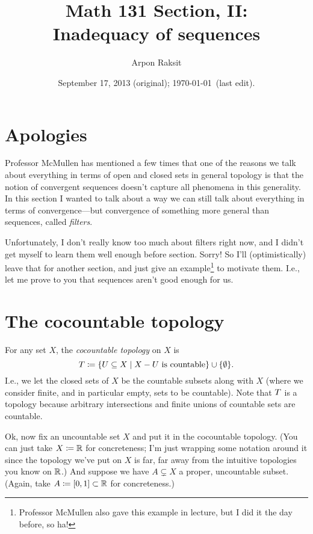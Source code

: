 


\title{Math 131 Section, II:\\Inadequacy of sequences}
\author{Arpon Raksit}
\date{September 17, 2013 (original); \today\ (last edit).}


\maketitle
\thispagestyle{fancy}


\section{Apologies}

Professor McMullen has mentioned a few times that one of the reasons
we talk about everything in terms of open and closed sets in general
topology is that the notion of convergent sequences doesn't capture
all phenomena in this generality. In this section I wanted to talk
about a way we can still talk about everything in terms of
convergence---but convergence of something more general than
sequences, called \textit{filters}.

Unfortunately, I don't really know too much about filters right now,
and I didn't get myself to learn them well enough before
section. Sorry! So I'll (optimistically) leave that for another
section, and just give an example\footnote{Professor McMullen also
  gave this example in lecture, but I did it the day before, so ha!}
to motivate them. I.e., let me prove to you that sequences aren't good
enough for us.

\section{The cocountable topology}

\begin{definition}
  For any set $X$, the \textit{cocountable topology} on $X$ is
\[
T \coloneqq \{U \subseteq X \mid X - U \text{ is countable}\} \cup
\{\emptyset\}.
\]
I.e., we let the closed sets of $X$ be the countable subsets along
with $X$ (where we consider finite, and in particular empty, sets to
be countable). Note that $T$ is a topology because arbitrary
intersections and finite unions of countable sets are countable.
\end{definition}

Ok, now fix an uncountable set $X$ and put it in the cocountable
topology. (You can just take $X \coloneqq \mathbb{R}$ for concreteness; I'm just
wrapping some notation around it since the topology we've put on $X$
is far, far away from the intuitive topologies you know on $\mathbb{R}$.)  And
suppose we have $A \subsetneq X$ a proper, uncountable subset. (Again,
take $A \coloneqq [0, 1] \subset \mathbb{R}$ for concreteness.)

